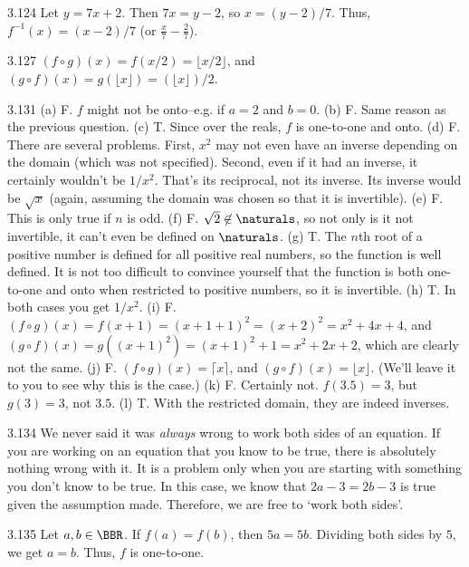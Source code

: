 \begin{Answer}{3.124}
Let $y=7x+2$.  Then $7x=y-2$, so $x=(y-2)/7$.  Thus, $f^{-1}(x)=(x-2)/7$
(or $\frac{x}{7}-\frac{2}{7}$).
\end{Answer}
\begin{Answer}{3.127}
$(f\circ g)(x)=f(x/2)=\lfloor x/2\rfloor$, and
$(g\circ f)(x)=g(\lfloor x\rfloor) = (\lfloor x\rfloor)/2$.
\end{Answer}
\begin{Answer}{3.131}
(a) F.  $f$ might not be onto--e.g. if $a=2$ and $b=0$.
(b) F. Same reason as the previous question.
(c) T. Since over the reals, $f$ is one-to-one and onto.
(d) F. There are several problems.  First, $x^2$ may not even have an inverse depending on
the domain (which was not specified).  Second, even if it had an inverse, it certainly wouldn't
be $1/x^2$.  That's its reciprocal, not its inverse.  Its inverse would be $\sqrt{x}$ (again,
assuming the domain was chosen so that it is invertible).
(e) F.  This is only true if $n$ is odd.
(f) F.  $\sqrt{2}\not\in\naturals$, so not only is it not invertible, it can't even be defined on $\naturals$.
(g) T.  The $n$th root of a positive number is defined for all positive real numbers, so the function is
well defined.  It is not too difficult to convince yourself that the function is both one-to-one and onto
when restricted to positive numbers, so it is invertible.
(h) T.  In both cases you get $1/x^2$.
(i) F.  $(f\circ g)(x)=f(x+1)=(x+1+1)^2=(x+2)^2=x^2+4x+4$, and $(g\circ f)(x)=g((x+1)^2)=(x+1)^2+1=x^2+2x+2$,
which are clearly not the same.
(j) F. $(f\circ g)(x)=\lceil x\rceil$, and $(g\circ f)(x)=\lfloor x\rfloor$.
(We'll leave it to you to see why this is the case.)
(k) F.  Certainly not.  $f(3.5)=3$, but $g(3)=3$, not $3.5$.
(l) T. With the restricted domain, they are indeed inverses.
\end{Answer}
\begin{Answer}{3.134}
We never said it was {\em always} wrong to work both sides of an equation.  If you are working
on an equation that you know to be true, there is absolutely nothing wrong with it.
It is a problem only when you are starting with something you don't know to be true.
In this case, we know that $2a-3=2b-3$ is true given the assumption made.  Therefore, we are
free to `work both sides'.
\end{Answer}
\begin{Answer}{3.135}
Let $a,b\in \BBR$.  If $f(a)=f(b)$, then $5a=5b$.  Dividing both sides by $5$, we get $a=b$.
Thus, $f$ is one-to-one.
\end{Answer}
